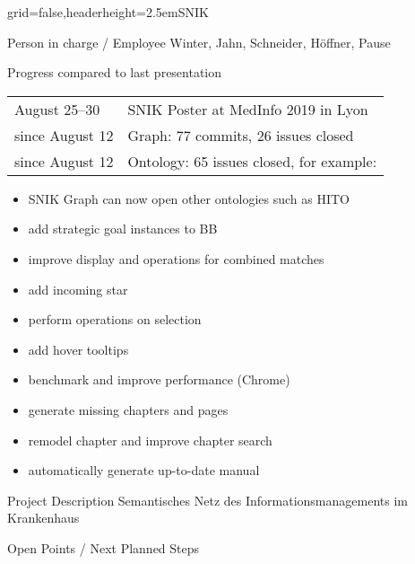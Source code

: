 \documentclass[]{kiesgrube}
\begin{document}
\begin{poster}%
{grid=false,headerheight=2.5em}{}{SNIK}{}

\begin{posterbox}[name=person,column=0,row=0]{Person in charge / Employee}
Winter, Jahn, Schneider, Höffner, Pause
\end{posterbox}
\begin{posterbox}[name=progress,below=person]{Progress compared to last presentation}
\begin{tabulary}{\textwidth}{lL}
August 25--30		&SNIK Poster at MedInfo 2019 in Lyon\\
since August 12		&Graph: 77 commits, 26 issues closed\\
since August 12		&Ontology: 65 issues closed, for example:
\end{tabulary}
\begin{itemize}
\item SNIK Graph can now open other ontologies such as HITO
\item add strategic goal instances to BB
\item improve display and operations for combined matches
\item add incoming star 
\item perform operations on selection 
\item add hover tooltips 
\item benchmark and improve performance (Chrome)
\item generate missing chapters and pages
\item remodel chapter and improve chapter search
\item automatically generate up-to-date manual
\end{itemize}
\end{posterbox}
\begin{posterbox}[name=description,column=1,row=0]{Project Description}
\small
Semantisches Netz des Informationsmanagements im Krankenhaus
\end{posterbox}
\begin{posterbox}[name=open,column=1,below=description]{Open Points / Next Planned Steps}
\footnotesize
\begin{itemize}

\end{itemize}
\end{posterbox}
\end{poster}
\end{document}
